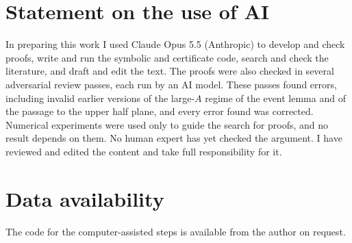 \documentclass[11pt]{amsart}
\theoremstyle{definition}
\theoremstyle{remark}
\numberwithin{equation}{section}
\begin{document}
\section*{Statement on the use of AI}
In preparing this work I used Claude Opus 5.5 (Anthropic) to develop and check proofs, write and run the symbolic and
certificate code, search and check the literature, and draft and edit the text. The proofs were also checked in
several adversarial review passes, each run by an AI model. These passes found errors, including invalid earlier
versions of the large-$A$ regime of the event lemma and of the passage to the upper half plane, and every error found
was corrected. Numerical experiments were used only to guide the search for proofs, and no result depends on them.
No human expert has yet checked the argument. I have reviewed and edited the content and take full responsibility
for it.

\section*{Data availability}
The code for the computer-assisted steps is available from the author on request.
\end{document}

